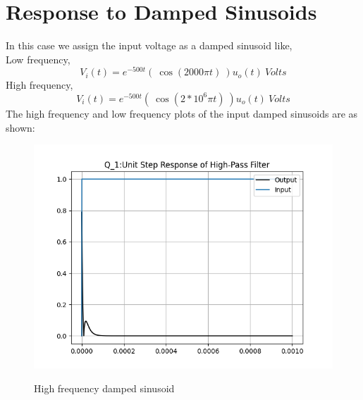 \documentclass[11pt, a4paper]{article}
\begin{document}
\section*{Response to Damped Sinusoids}
In this case we assign the input voltage as a damped sinusoid like,\\
Low frequency,
\begin{equation*}
    V_{i}(t) = e^{-500t}( \ \cos(2000\pi t) \ )u_{o}(t) \ Volts
\end{equation*}
High frequency,
\begin{equation*}
    V_{i}(t) = e^{-500t}( \ \cos(2*10^{6}\pi t) \ )u_{o}(t) \ Volts
\end{equation*}
The high frequency and low frequency plots of the input damped sinusoids are as shown:\newpage
\begin{figure}[!tbh]
   	\centering
   	\includegraphics[width=1.0\textwidth]{Figure4.png}
   	\label{fig:32}
   	\caption{High frequency damped sinusoid}
   \end{figure}
   
\end{document}
